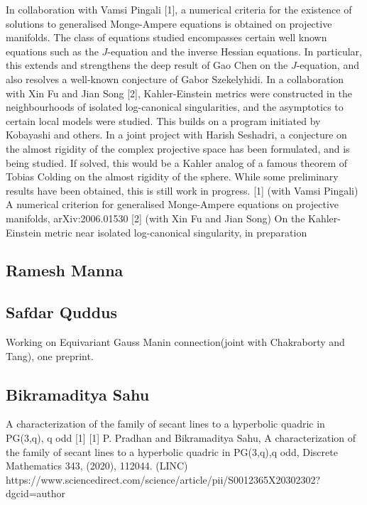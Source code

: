 In collaboration with Vamsi Pingali [1],  a numerical criteria for the existence of solutions to generalised Monge-Ampere equations is obtained  on projective manifolds. The class of equations studied encompasses certain well known equations such as the $J$-equation and the inverse Hessian equations. In particular, this extends and strengthens the deep result of Gao Chen on the $J$-equation, and also resolves a well-known conjecture of Gabor Szekelyhidi.   In a collaboration with Xin Fu and Jian Song [2], Kahler-Einstein metrics were constructed in the neighbourhoods of isolated log-canonical singularities, and the asymptotics to certain local models were studied. This builds on a program initiated by Kobayashi and others.    In a joint project with Harish Seshadri, a conjecture on the almost rigidity of the complex projective space has been formulated, and is being studied. If solved, this would be a Kahler analog of a famous theorem of Tobias Colding on the almost rigidity of the sphere. While some preliminary results have been obtained, this is still work in progress.  [1] (with Vamsi Pingali) A numerical criterion for generalised Monge-Ampere equations on projective manifolds, arXiv:2006.01530 [2] (with Xin Fu and Jian Song) On the Kahler-Einstein metric near isolated log-canonical singularity,  in  preparation\subsection{Ramesh Manna}




\subsection{Safdar Quddus}

Working on Equivariant Gauss Manin connection(joint with Chakraborty and Tang), one preprint.


\subsection{Bikramaditya Sahu}

A characterization of the family of secant lines to a hyperbolic quadric in PG(3,q), q odd [1]  [1] P. Pradhan and Bikramaditya Sahu, A characterization of the family of secant lines to a hyperbolic quadric in PG(3,q),q odd, Discrete Mathematics 343, (2020), 112044.   (LINC) https://www.sciencedirect.com/science/article/pii/S0012365X20302302?dgcid=author


